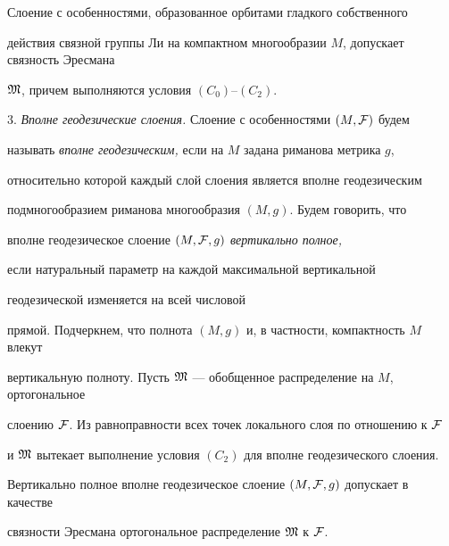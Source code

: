 \begin{prop}\label{pr2}


Слоение с особенностями, образованное орбитами гладкого  собственного


действия связной группы Ли на компактном многообразии $M$, допускает связность Эресмана


$\frak M$, причем выполняются условия $(C_0)$--$(C_2)$.


\end{prop}





3. {\it Вполне геодезические слоения.} Слоение с особенностями $(M,\cal F)$ будем


называть {\it вполне геодезическим,} если на $M$ задана риманова метрика $g$,


относительно которой каждый слой слоения является вполне геодезическим


подмногообразием риманова многообразия $(M,g)$. Будем говорить, что


вполне геодезическое слоение $(M,{\cal F},g)$ {\it вертикально полное,}


если натуральный параметр на каждой максимальной вертикальной


геодезической изменяется на всей числовой


прямой. Подчеркнем, что полнота $(M,g)$ и, в частности, компактность $M$ влекут


вертикальную полноту. Пусть $\frak M$ --- обобщенное распределение на $M$, ортогональное


слоению $\cal F$. Из равноправности всех точек локального слоя по отношению к $\cal F$


и $\frak M$ вытекает выполнение условия $(C_2)$ для вполне геодезического слоения.





\begin{prop}\label{pr3}


Вертикально полное вполне геодезическое слоение $(M,{\cal F},g)$ допускает в качестве


связности Эресмана ортогональное распределение $\frak M$ к $\cal F$.


\end{prop}





